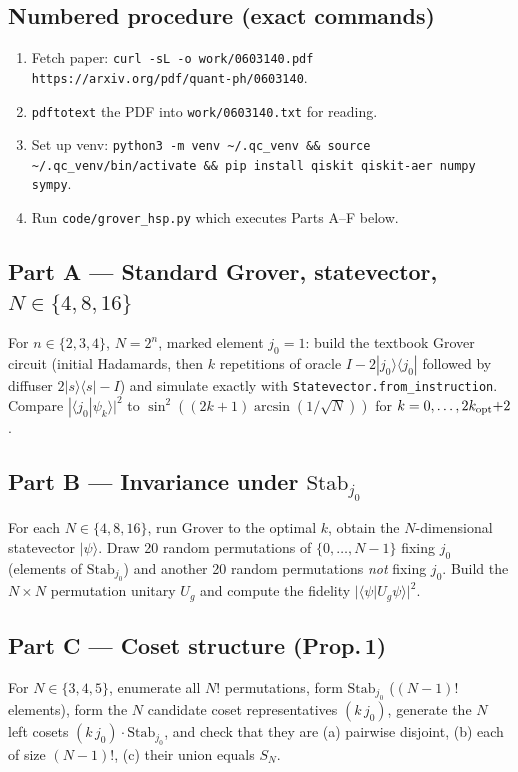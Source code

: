 \documentclass[11pt]{article}
\begin{document}
\subsection{Numbered procedure (exact commands)}
\begin{enumerate}
\item Fetch paper: \texttt{curl -sL -o work/0603140.pdf https://arxiv.org/pdf/quant-ph/0603140}.
\item \texttt{pdftotext} the PDF into \texttt{work/0603140.txt} for reading.
\item Set up venv: \texttt{python3 -m venv \~{}/.qc\_venv \&\& source \~{}/.qc\_venv/bin/activate \&\& pip install qiskit qiskit-aer numpy sympy}.
\item Run \texttt{code/grover\_hsp.py} which executes Parts A--F below.
\end{enumerate}

\subsection{Part A --- Standard Grover, statevector, $N\in\{4,8,16\}$}
For $n\in\{2,3,4\}$, $N=2^n$, marked element $j_0=1$: build the textbook
Grover circuit (initial Hadamards, then $k$ repetitions of oracle
$I-2|j_0\rangle\langle j_0|$ followed by diffuser
$2|s\rangle\langle s|-I$) and simulate exactly with \texttt{Statevector.from\_instruction}.
Compare $|\langle j_0|\psi_k\rangle|^{2}$ to
$\sin^{2}((2k{+}1)\arcsin(1/\sqrt N))$ for $k=0,\dots,2k_{\rm opt}{+}2$.

\subsection{Part B --- Invariance under $\mathrm{Stab}_{j_0}$}
For each $N\in\{4,8,16\}$, run Grover to the optimal $k$, obtain the
$N$-dimensional statevector $|\psi\rangle$.  Draw 20 random permutations of
$\{0,\dots,N-1\}$ fixing $j_0$ (elements of $\mathrm{Stab}_{j_0}$) and
another 20 random permutations \emph{not} fixing $j_0$.  Build the
$N\times N$ permutation unitary $U_g$ and compute the fidelity
$|\langle\psi|U_g\psi\rangle|^{2}$.

\subsection{Part C --- Coset structure (Prop.\,1)}
For $N\in\{3,4,5\}$, enumerate all $N!$ permutations, form
$\mathrm{Stab}_{j_0}$ ($(N{-}1)!$ elements), form the $N$ candidate coset
representatives $(k\,j_0)$, generate the $N$ left cosets
$(k\,j_0)\cdot\mathrm{Stab}_{j_0}$, and check that they are (a) pairwise
disjoint, (b) each of size $(N{-}1)!$, (c) their union equals $S_N$.
\end{document}
